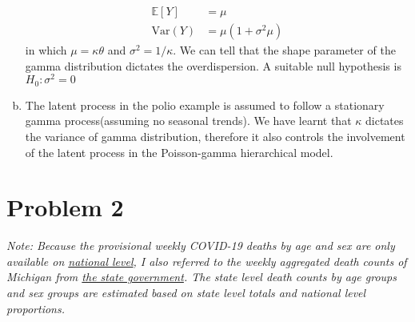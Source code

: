 \documentclass[12pt]{article}
\begin{document}
\begin{enumerate}[(a)]
	\begin{align*}
		\mathbb{E}[Y] &= \mu \\
		\text{Var}(Y) &= \mu(1+\sigma^2 \mu)
	\end{align*}
	in which $\mu = \kappa\theta$ and $\sigma^2 = 1/\kappa$. We can tell that the shape parameter of the gamma distribution dictates the overdispersion. A suitable null hypothesis is $H_{0} : \sigma^2 = 0$
	\item The latent process in the polio example is assumed to follow a stationary gamma process(assuming no seasonal trends). We have learnt that $\kappa$ dictates the variance of gamma distribution, therefore it also controls the involvement of the latent process in the Poisson-gamma hierarchical model.
\end{enumerate}
 

\section*{Problem 2}
\emph{Note: Because the provisional weekly COVID-19 deaths by age and sex are only available on \href{https://data.cdc.gov/NCHS/Provisional-COVID-19-Deaths-by-Week-Sex-and-Age/vsak-wrfu}{national level}, I also referred to the weekly aggregated death counts of Michigan from \href{https://www.michigan.gov/coronavirus/-/media/Project/Websites/coronavirus/Michigan-Data/10-04-2022/Datasets/Cases-and-Deaths-by-County-and-by-Date-of-Symptom-Onset-or-by-Date-of-Death2022-10-04.xlsx?rev=d9568cd19a45423aac6c03af0ce87707&hash=EF2BBF61BD1BFFB0E9F20527E91DCC47}{the state government}. The state level death counts by age groups and sex groups are estimated based on state level totals and national level proportions.}  
\end{document}
